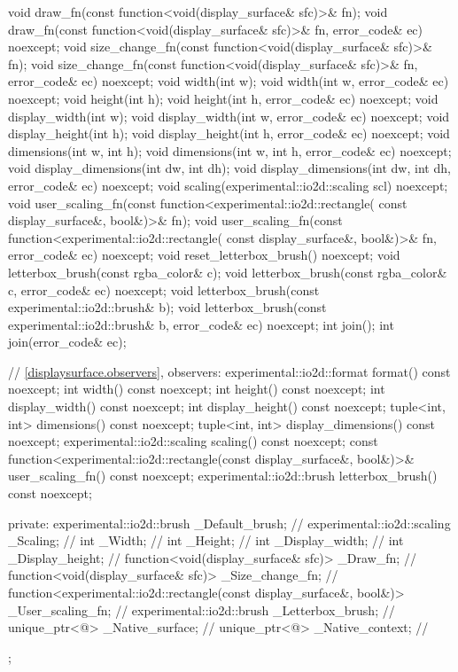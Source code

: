 \begin{codeblock}
{{{{{    void draw_fn(const function<void(display_surface& sfc)>& fn);
    void draw_fn(const function<void(display_surface& sfc)>& fn,
      error_code& ec) noexcept;
    void size_change_fn(const function<void(display_surface& sfc)>& fn);
    void size_change_fn(const function<void(display_surface& sfc)>& fn,
      error_code& ec) noexcept;
    void width(int w);
    void width(int w, error_code& ec) noexcept;
    void height(int h);
    void height(int h, error_code& ec) noexcept;
    void display_width(int w);
    void display_width(int w, error_code& ec) noexcept;
    void display_height(int h);
    void display_height(int h, error_code& ec) noexcept;
    void dimensions(int w, int h);
    void dimensions(int w, int h, error_code& ec) noexcept;
    void display_dimensions(int dw, int dh);
    void display_dimensions(int dw, int dh, error_code& ec) noexcept;
    void scaling(experimental::io2d::scaling scl) noexcept;
    void user_scaling_fn(const function<experimental::io2d::rectangle(
      const display_surface&, bool&)>& fn);
    void user_scaling_fn(const function<experimental::io2d::rectangle(
      const display_surface&, bool&)>& fn, error_code& ec) noexcept;
    void reset_letterbox_brush() noexcept;
    void letterbox_brush(const rgba_color& c);
    void letterbox_brush(const rgba_color& c, error_code& ec) noexcept;
    void letterbox_brush(const experimental::io2d::brush& b);
    void letterbox_brush(const experimental::io2d::brush& b, error_code& ec) noexcept;
    int join();
    int join(error_code& ec);
    
    // \ref{displaysurface.observers}, observers:
    experimental::io2d::format format() const noexcept;
    int width() const noexcept;
    int height() const noexcept;
    int display_width() const noexcept;
    int display_height() const noexcept;
    tuple<int, int> dimensions() const noexcept;
    tuple<int, int> display_dimensions() const noexcept;
    experimental::io2d::scaling scaling() const noexcept;
    const function<experimental::io2d::rectangle(const display_surface&,
      bool&)>& user_scaling_fn() const noexcept;
    experimental::io2d::brush letterbox_brush() const noexcept;

  private:
    experimental::io2d::brush _Default_brush;             // \expos
    experimental::io2d::scaling _Scaling;                 // \expos
    int _Width;                                           // \expos
    int _Height;                                          // \expos
    int _Display_width;                                   // \expos
    int _Display_height;                                  // \expos
    function<void(display_surface& sfc)> _Draw_fn;        // \expos
    function<void(display_surface& sfc)> _Size_change_fn; // \expos
    function<experimental::io2d::rectangle(const display_surface&, bool&)> 
      _User_scaling_fn;                                   // \expos
    experimental::io2d::brush _Letterbox_brush;           // \expos    
    unique_ptr<@\impdef@> _Native_surface;   // \expos
    unique_ptr<@\impdef@> _Native_context;   // \expos
  };
} } } }
\end{codeblock}

